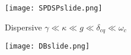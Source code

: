 \documentclass{beamer}
\begin{document}
\begin{frame}
    \texttt{[image: SPDSPslide.png]}
\end{frame}
\begin{frame}
    \begin{block}{Dispersive}
            $\gamma \ll \kappa \ll g \ll \delta_{cq} \ll \omega_c$
    \end{block}
\end{frame}
\begin{frame}
    \texttt{[image: DBslide.png]}
\end{frame}
\printbibliography\
\end{document}
